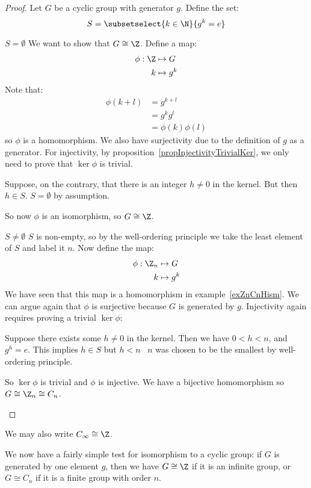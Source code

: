 \documentclass[../Main.tex]{subfiles}
\begin{document}
\begin{proof}
    Let $G$ be a cyclic group with generator $g$. Define the set:
    \begin{equation*}
        S = \subsetselect{k \in \N}{g^k = e}
    \end{equation*}
    \begin{case}{$S = \emptyset$}
        We want to show that $G \cong \Z$. Define a map:
        \begin{align*}
            \phi : \Z &\mapsto G \\
            k &\mapsto g^k
        \end{align*}
        Note that:
        \begin{align*}
            \phi(k+l) &= g^{k + l} \\
            &= g^k g^l \\
            &= \phi(k) \phi(l)
        \end{align*}
        so $\phi$ is a homomorphism. We also have surjectivity due to the definition of $g$ as a generator. For injectivity, by proposition~\ref{propInjectivityTrivialKer}, we only need to prove that $\ker{\phi}$ is trivial.\par
        Suppose, on the contrary, that there is an integer $h \neq 0$ in the kernel. But then $h \in S$. \contradiction $S = \emptyset$ by assumption.\par
        So now $\phi$ is an isomorphism, so $G \cong \Z$.
    \end{case}
    \begin{case}{$S \neq \emptyset$}
        $S$ is non-empty, so by the well-ordering principle we take the least element of $S$ and label it $n$. Now define the map:
        \begin{align*}
            \phi : \Z_n &\mapsto G \\
            k &\mapsto g^k
        \end{align*}
        We have seen that this map is a homomorphism in example~\ref{exZnCnHism}. We can argue again that $\phi$ is surjective because $G$ is generated by $g$. Injectivity again requires proving a trivial $\ker{\phi}$:\par
        Suppose there exists some $h \neq 0$ in the kernel. Then we have $0 < h < n$, and $g^h = e$. This implies $h \in S$ but $h < n$ \contradiction~$n$ was chosen to be the smallest by well-ordering principle.\par
        So $\ker{\phi}$ is trivial and $\phi$ is injective. We have a bijective homomorphism so $G \cong \Z_n \cong C_n$.
    \end{case}
\end{proof}
\begin{remark}
    We may also write $C_\infty \cong \Z$.
\end{remark}
We now have a fairly simple test for isomorphism to a cyclic group: if $G$ is generated by one element $g$, then we have $G \cong \Z$ if it is an infinite group, or $G \cong C_n$ if it is a finite group with order $n$.
\end{document}
